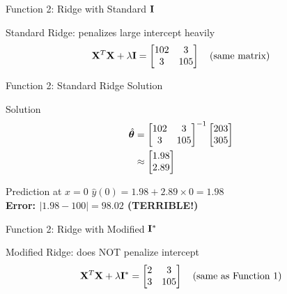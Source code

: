 \documentclass{beamer}
\begin{document}
\begin{frame}{Function 2: Ridge with Standard $\mathbf{I}$}
\begin{codebox}{Standard Ridge: penalizes large intercept heavily}
$$\mathbf{X}^T\mathbf{X} + \lambda\mathbf{I} = \begin{bmatrix} 102 & 3 \\ 3 & 105 \end{bmatrix} \quad \text{(same matrix)}$$
\end{codebox}
\end{frame}

\begin{frame}{Function 2: Standard Ridge Solution}
\begin{codebox}{Solution}
\begin{align}
\hat{\boldsymbol{\theta}} &= \begin{bmatrix} 102 & 3 \\ 3 & 105 \end{bmatrix}^{-1} \begin{bmatrix} 203 \\ 305 \end{bmatrix} \\
&\approx \begin{bmatrix} 1.98 \\ 2.89 \end{bmatrix}
\end{align}
\end{codebox}
\pause

\begin{theorembox}{Prediction at $x=0$}
$\hat{y}(0) = 1.98 + 2.89 \times 0 = 1.98$ \\
{\color{red}\textbf{Error: $|1.98 - 100| = 98.02$ (TERRIBLE!)}}
\end{theorembox}
\end{frame}

\begin{frame}{Function 2: Ridge with Modified $\mathbf{I}^*$}
\begin{codebox}{Modified Ridge: does NOT penalize intercept}
$$\mathbf{X}^T\mathbf{X} + \lambda\mathbf{I}^* = \begin{bmatrix} 2 & 3 \\ 3 & 105 \end{bmatrix} \quad \text{(same as Function 1)}$$
\end{codebox}
\end{frame}
\end{document}

